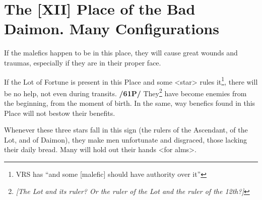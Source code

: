 \section{The [XII] Place of the Bad Daimon. Many Configurations}

If the malefics happen to be in this place, they will cause great wounds and traumas, especially if they are in their proper face. 

If the Lot of Fortune is present in this Place and some <star> rules it\footnote{VRS has ``and some [malefic] should have authority over it''}, there will be no help, not even during transits. \textbf{/61P/} They\footnote{\textit{[The Lot and its ruler? Or the ruler of the Lot and the ruler of the 12th?]}} have become enemies from the beginning, from the moment of birth. In the same, way benefics found in this Place will not bestow their benefits. 

Whenever these three stars fall in this sign (the rulers of the Ascendant, of the Lot, and of Daimon), they make men unfortunate and disgraced, those lacking their daily bread. Many will hold out their hands <for alms>.

\newpage